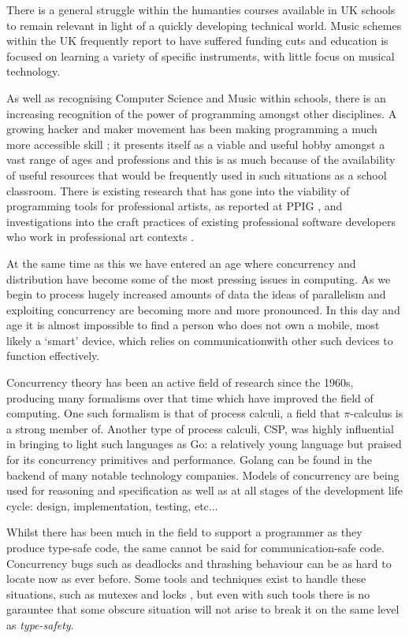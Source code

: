 \documentclass[11pt, abstracton, twoside]{scrartcl}
\begin{document}
There is a general struggle within the humanties courses available in UK schools 
to remain relevant in light of a quickly developing technical world. Music schemes 
within the UK frequently report to have suffered funding cuts and education is 
focused on learning a variety of specific instruments, with little focus on 
musical technology.

As well as recognising Computer Science and Music within schools, there 
is an increasing recognition of the power of programming amongst other disciplines. 
A growing hacker and maker movement has been making programming a 
much more accessible skill \cite{BAD14}; it presents itself as a viable and 
useful hobby amongst a vast range of ages and professions and this is as much 
because of the availability of useful resources that would be frequently used 
in such situations as a school classroom. There is existing research that has 
gone into the viability of programming tools for professional artists, as 
reported at PPIG \cite{Ch12,BC05}, and investigations into the craft practices 
of existing professional software developers who work in professional art 
contexts \cite{W10}.

At the same time as this we have entered an age where concurrency and 
distribution have become some of the most pressing issues in computing. As we 
begin to process hugely increased amounts of data the ideas of parallelism and 
exploiting concurrency are becoming more and more pronounced. In this day and age
it is almost impossible to find a person who does not own a mobile, most likely a 
`smart' device, which relies on communicationwith other such devices to function 
effectively. 

Concurrency theory has been an active field of research since the 1960s, producing
many formalisms over that time which have improved the field of computing. One 
such formalism is that of process calculi, a field that $\pi$-calculus is a strong
member of. Another type of process calculi, CSP, was highly influential in 
bringing to light such languages as Go: a relatively young language but praised
for its concurrency primitives and performance. Golang can be found in the backend
of many notable technology companies. Models of concurrency are being used for
reasoning and specification as well as at all stages of the development life
cycle: design, implementation, testing, etc...

Whilst there has been much in the field to support a programmer as they produce
type-safe code, the same cannot be said for communication-safe code. Concurrency
bugs such as deadlocks and thrashing behaviour can be as hard to locate now as
ever before. Some tools and techniques exist to handle these situations, such as
mutexes and locks \cite{T95}, but even with such tools there is no garauntee
that some obscure situation will not arise to break it on the same level as 
\emph{type-safety}.
\end{document}
